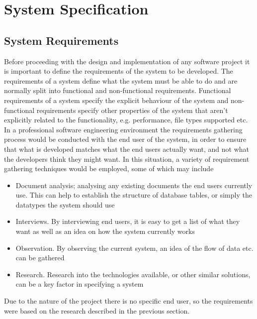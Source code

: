 \chapter{System Specification}

\section{System Requirements}
\label{sec:require}
Before proceeding with the design and implementation of any software project it is important to define the requirements of the system to be developed. The requirements of a system define what the system must be able to do and are normally split into functional and non-functional requirements. Functional requirements of a system specify the explicit behaviour of the system and non-functional requirements specify other properties of the system that aren't explicitly related to the functionality, e.g. performance, file types supported etc.
\\In a professional software engineering environment the requirements gathering process would be conducted with the end user of the system, in order to ensure that what is developed matches what the end users actually want, and not what the developers think they might want. In this situation, a variety of requirement gathering techniques would be employed, some of which may include
\begin{itemize}
  \item{Document analysis; analysing any existing documents the end users currently use. This can help to establish the structure of database tables, or simply the datatypes the system should use}
  \item{Interviews. By interviewing end users, it is easy to get a list of what they want as well as an idea on how the system currently works}
  \item{Observation. By observing the current system, an idea of the flow of data etc. can be gathered}
  \item{Research. Research into the technologies available, or other similar solutions, can be a key factor in specifying a system}
\end{itemize}
Due to the nature of the project there is no specific end user, so the requirements were based on the research described in the previous section.

